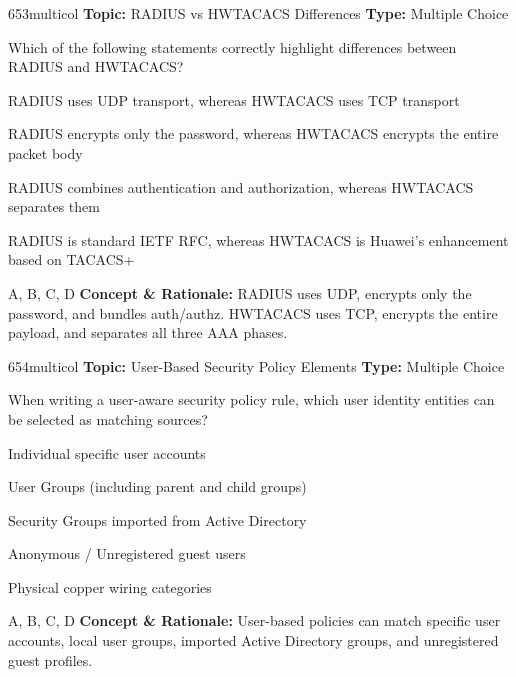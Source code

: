 \begin{qcard}{653}{multicol}
\textcolor{darkslate!75}{\small\textbf{Topic:} RADIUS vs HWTACACS Differences \hfill \textbf{Type:} Multiple Choice}\vspace{0.4em}\par
Which of the following statements correctly highlight differences between RADIUS and HWTACACS?
\begin{qoptions}
\item RADIUS uses UDP transport, whereas HWTACACS uses TCP transport
\item RADIUS encrypts only the password, whereas HWTACACS encrypts the entire packet body
\item RADIUS combines authentication and authorization, whereas HWTACACS separates them
\item RADIUS is standard IETF RFC, whereas HWTACACS is Huawei's enhancement based on TACACS+
\end{qoptions}
\end{qcard}
\nopagebreak
\begin{explainbox}{A, B, C, D}
\textbf{Concept \& Rationale:} RADIUS uses UDP, encrypts only the password, and bundles auth/authz. HWTACACS uses TCP, encrypts the entire payload, and separates all three AAA phases.
\end{explainbox}

\begin{qcard}{654}{multicol}
\textcolor{darkslate!75}{\small\textbf{Topic:} User-Based Security Policy Elements \hfill \textbf{Type:} Multiple Choice}\vspace{0.4em}\par
When writing a user-aware security policy rule, which user identity entities can be selected as matching sources?
\begin{qoptions}
\item Individual specific user accounts
\item User Groups (including parent and child groups)
\item Security Groups imported from Active Directory
\item Anonymous / Unregistered guest users
\item Physical copper wiring categories
\end{qoptions}
\end{qcard}
\nopagebreak
\begin{explainbox}{A, B, C, D}
\textbf{Concept \& Rationale:} User-based policies can match specific user accounts, local user groups, imported Active Directory groups, and unregistered guest profiles.
\end{explainbox}

